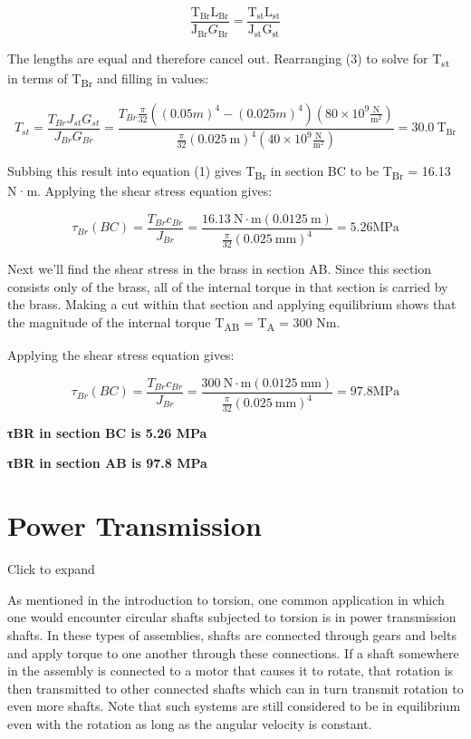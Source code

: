 \documentclass[
  letterpaper,
  DIV=11,
  numbers=noendperiod]{scrreprt}
\begin{document}
\begin{tcolorbox}
\begin{tcolorbox}
\[
\frac{\mathrm{T}_{\mathrm{Br}} \mathrm{L}_{\mathrm{Br}}}{\mathrm{J}_{\mathrm{Br}} G_{\mathrm{Br}}}=\frac{\mathrm{T}_{\mathrm{st}} \mathrm{L}_{\mathrm{st}}}{\mathrm{J}_{\mathrm{st}} \mathrm{G}_{\mathrm{st}}}
\]

The lengths are equal and therefore cancel out. Rearranging (3) to solve
for T\textsubscript{st} in terms of T\textsubscript{Br} and filling in
values:

\[
T_{s t}=\frac{T_{B r} J_{s t} G_{s t}}{J_{B r} G_{B r}}=\frac{T_{B r} \frac{\pi}{32}\left((0.05 m)^4-(0.025 m)^4\right)\left(80 \times 10^9 \frac{\mathrm{N}}{\mathrm{m}^2}\right)}{\frac{\pi}{32}(0.025 \mathrm{~m})^4\left(40 \times 10^9 \frac{\mathrm{N}}{\mathrm{m}^2}\right)}=30.0 \mathrm{~T}_{\mathrm{Br}}
\]

Subbing this result into equation (1) gives T\textsubscript{Br} in
section BC to be T\textsubscript{Br} = 16.13 N·m. Applying the shear
stress equation gives:

\[
\tau_{B r}(B C)=\frac{T_{B r} c_{B r}}{J_{B r}}=\frac{16.13 \mathrm{~N} \cdot \mathrm{m}(0.0125 \mathrm{~m})}{\frac{\pi}{32}(0.025 \mathrm{~mm})^4}=5.26 \mathrm{MPa}
\]

Next we'll find the shear stress in the brass in section AB. Since this
section consists only of the brass, all of the internal torque in that
section is carried by the brass. Making a cut within that section and
applying equilibrium shows that the magnitude of the internal torque
T\textsubscript{AB} = T\textsubscript{A} = 300 Nm.

Applying the shear stress equation gives:

\[
\tau_{B r}(B C)=\frac{T_{B r} c_{B r}}{J_{B r}}=\frac{300 \mathrm{~N} \cdot \mathrm{m}(0.0125 \mathrm{~mm})}{\frac{\pi}{32}(0.025 \mathrm{~mm})^4}=97.8 \mathrm{MPa}
\]

\textbf{τBR in section BC is 5.26 MPa}

\textbf{τBR in section AB is 97.8 MPa}

\end{tcolorbox}

\end{tcolorbox}

\section{Power Transmission}\label{sec-6.4}

Click to expand

As mentioned in the introduction to torsion, one common application in
which one would encounter circular shafts subjected to torsion is in
power transmission shafts. In these types of assemblies, shafts are
connected through gears and belts and apply torque to one another
through these connections. If a shaft somewhere in the assembly is
connected to a motor that causes it to rotate, that rotation is then
transmitted to other connected shafts which can in turn transmit
rotation to even more shafts. Note that such systems are still
considered to be in equilibrium even with the rotation as long as the
angular velocity is constant.
\end{document}
